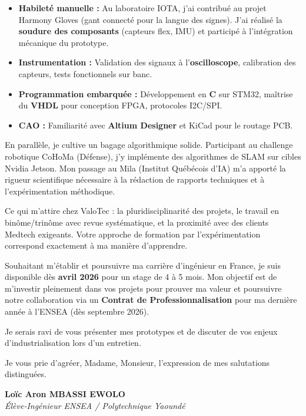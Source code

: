\documentclass[11pt,a4paper]{letter}
\begin{document}
\begin{itemize}
    \item \textbf{Habileté manuelle :} Au laboratoire IOTA, j'ai contribué au projet Harmony Gloves (gant connecté pour la langue des signes). J'ai réalisé la \textbf{soudure des composants} (capteurs flex, IMU) et participé à l'intégration mécanique du prototype.
    \item \textbf{Instrumentation :} Validation des signaux à l'\textbf{oscilloscope}, calibration des capteurs, tests fonctionnels sur banc.
    \item \textbf{Programmation embarquée :} Développement en \textbf{C} sur STM32, maîtrise du \textbf{VHDL} pour conception FPGA, protocoles I2C/SPI.
    \item \textbf{CAO :} Familiarité avec \textbf{Altium Designer} et KiCad pour le routage PCB.
\end{itemize}

\vspace{0.2cm}

En parallèle, je cultive un bagage algorithmique solide. Participant au challenge robotique CoHoMa (Défense), j'y implémente des algorithmes de SLAM sur cibles Nvidia Jetson. Mon passage au Mila (Institut Québécois d'IA) m'a apporté la rigueur scientifique nécessaire à la rédaction de rapports techniques et à l'expérimentation méthodique.

\vspace{0.3cm}

Ce qui m'attire chez ValoTec : la pluridisciplinarité des projets, le travail en binôme/trinôme avec revue systématique, et la proximité avec des clients Medtech exigeants. Votre approche de formation par l'expérimentation correspond exactement à ma manière d'apprendre.

\vspace{0.3cm}

Souhaitant m'établir et poursuivre ma carrière d'ingénieur en France, je suis disponible dès \textbf{avril 2026} pour un stage de 4 à 5 mois. Mon objectif est de m'investir pleinement dans vos projets pour prouver ma valeur et poursuivre notre collaboration via un \textbf{Contrat de Professionnalisation} pour ma dernière année à l'ENSEA (dès septembre 2026).

\vspace{0.3cm}

Je serais ravi de vous présenter mes prototypes et de discuter de vos enjeux d'industrialisation lors d'un entretien.

\vspace{0.4cm}

Je vous prie d'agréer, Madame, Monsieur, l'expression de mes salutations distinguées.

\vspace{0.8cm}

\noindent\textbf{Loïc Aron MBASSI EWOLO} \\
\textit{Élève-Ingénieur ENSEA / Polytechnique Yaoundé}
\end{document}
